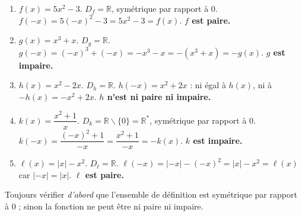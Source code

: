 \documentclass[11pt]{article}
\def\setminus{\mathbin{\backslash}}\let\smallsetminus\setminus
\begin{document}
\begin{corrige}
\begin{enumerate}
    \item $f(x)=5x^2-3$. $D_f=\mathbb{R}$, symétrique par rapport à $0$. $f(-x)=5(-x)^2-3=5x^2-3=f(x)$. \textbf{$f$ est paire.}
    \item $g(x)=x^3+x$. $D_g=\mathbb{R}$. $g(-x)=(-x)^3+(-x)=-x^3-x=-(x^3+x)=-g(x)$. \textbf{$g$ est impaire.}
    \item $h(x)=x^2-2x$. $D_h=\mathbb{R}$. $h(-x)=x^2+2x$ : ni égal à $h(x)$, ni à $-h(x)=-x^2+2x$. \textbf{$h$ n'est ni paire ni impaire.}
    \item $k(x)=\dfrac{x^2+1}{x}$. $D_k=\mathbb{R}\setminus\{0\}=\mathbb{R}^*$, symétrique par rapport à $0$. $k(-x)=\dfrac{(-x)^2+1}{-x}=\dfrac{x^2+1}{-x}=-k(x)$. \textbf{$k$ est impaire.}
    \item $\ell(x)=|x|-x^2$. $D_\ell=\mathbb{R}$. $\ell(-x)=|-x|-(-x)^2=|x|-x^2=\ell(x)$ car $|-x|=|x|$. \textbf{$\ell$ est paire.}
\end{enumerate}
\begin{attention}
Toujours vérifier \emph{d'abord} que l'ensemble de définition est symétrique par rapport à $0$ ; sinon la fonction ne peut être ni paire ni impaire.
\end{attention}
\end{corrige}
\end{document}
